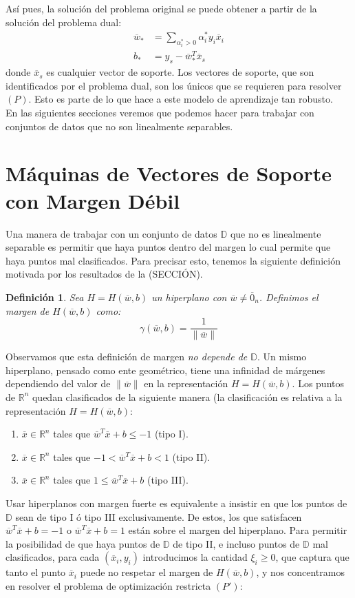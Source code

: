 \documentclass[11pt]{article}
\newtheorem{definition}{Definición}[section]
\newcommand{\R}{\mathbb{R}}
\newcommand{\Rn}{\R^{n}}
\newcommand{\wv}{\overline{w}}
\newcommand{\x}{\overline{x}}
\newcommand{\z}{\overline{0}_{n}}
\newcommand{\bo}{b_{*}}
\newcommand{\wo}{\wv_{*}}
\newcommand{\alio}{\alpha_{i}^{*}}
\newcommand{\Dat}{\mathbb{D}}
\newcommand{\nw}{\|\wv\|}
\begin{document}
Así pues, la solución del problema original se puede obtener a partir de la solución del problema dual:
\begin{equation*}
\begin{aligned}
\wo&=\sum_{\alio>0}\alio y_{i}\x_{i}\\
\bo&=y_{s}-\wo^{T}\x_{s}
\end{aligned}
\end{equation*}
donde $\x_{s}$ es cualquier vector de soporte. Los vectores de soporte, que son identificados por el problema dual, son los únicos que se requieren para resolver $(P)$. Esto es parte de lo que hace a este modelo de aprendizaje tan robusto.\\

En las siguientes secciones veremos que podemos hacer para trabajar con conjuntos de datos que no son linealmente separables.

\section{Máquinas de Vectores de Soporte con Margen Débil}
Una manera de trabajar con un conjunto de datos $\Dat$ que no es linealmente separable es permitir que haya puntos dentro del margen lo cual permite que haya puntos mal clasificados. Para precisar esto, tenemos la siguiente definición motivada por los resultados de la (SECCIÓN).

\begin{definition}
Sea $H=H(\wv, b)$ un hiperplano con $\wv\ne\z$. Definimos el margen de $H(\wv, b)$ como:
$$\gamma (\wv, b)=\frac{1}{\nw}$$
\end{definition}

Observamos que esta definición de margen \emph{no depende de $\Dat$}. Un mismo hiperplano, pensado como ente geométrico, tiene una infinidad de márgenes dependiendo del valor de $\nw$ en la representación $H=H(\wv, b)$. Los puntos de $\Rn$ quedan clasificados de la siguiente manera (la clasificación es relativa a la representación $H=H(\wv, b)$:
\begin{enumerate}
\item $\x\in\Rn$ tales que $\wv^{T}\x+b\leq -1$ (tipo I).
\item $\x\in\Rn$ tales que $-1<\wv^{T}\x+b<1$ (tipo II).
\item $\x\in\Rn$ tales que $1\leq\wv^{T}\x+b$ (tipo III).
\end{enumerate}

Usar hiperplanos con margen fuerte es equivalente a insistir en que los puntos de $\Dat$ sean de tipo I ó tipo III exclusivamente. De estos, los que satisfacen $\wv^{T}\x+b=-1$ o $\wv^{T}\x+b=1$ están sobre el margen del hiperplano. Para permitir la posibilidad de que haya puntos de $\Dat$ de tipo II, e incluso puntos de $\Dat$ mal clasificados, para cada $(\x_{i}, y_{i})$ introducimos la cantidad $\xi_{i}\geq0$, que captura que tanto el punto $\x_{i}$ puede no respetar el margen de $H(\wv, b)$, y nos concentramos en resolver el problema de optimización restricta $(P')$:
\end{document}
